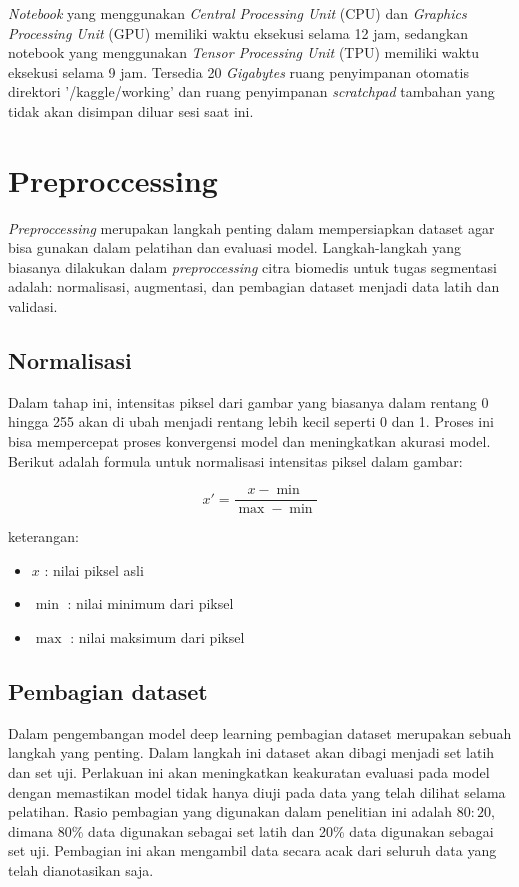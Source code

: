 \noindent \textit{Notebook} yang menggunakan \textit{Central Processing Unit }(CPU) dan \textit{Graphics Processing Unit} (GPU) memiliki waktu eksekusi selama 12 jam, sedangkan notebook yang menggunakan \textit{Tensor Processing Unit} (TPU) memiliki waktu eksekusi selama 9 jam. Tersedia 20 \textit{Gigabytes} ruang penyimpanan otomatis direktori '/kaggle/working' dan ruang penyimpanan \textit{scratchpad} tambahan yang tidak akan disimpan diluar sesi saat ini.


\section{Preproccessing}

\noindent \textit{Preproccessing} merupakan langkah penting dalam mempersiapkan dataset agar bisa gunakan dalam pelatihan dan evaluasi model. Langkah-langkah yang biasanya dilakukan dalam \textit{preproccessing} citra biomedis untuk tugas segmentasi adalah: normalisasi, augmentasi, dan pembagian dataset menjadi data latih dan validasi.

\subsection{Normalisasi}

\noindent Dalam tahap ini, intensitas piksel dari gambar yang biasanya dalam rentang 0 hingga 255 akan di ubah menjadi rentang lebih kecil seperti 0 dan 1. Proses ini bisa mempercepat proses konvergensi model dan meningkatkan akurasi model. Berikut adalah formula untuk normalisasi intensitas piksel dalam gambar:

\begin{equation}
	x' = \frac{x - \min}{\max - \min}
\end{equation}

\noindent
keterangan:
\begin{itemize}
	\item $x$ : nilai piksel asli
	\item $\min$ : nilai minimum dari piksel
	\item $\max$ : nilai maksimum dari piksel
\end{itemize}


\subsection{Pembagian dataset}

\noindent Dalam pengembangan model deep learning pembagian dataset merupakan sebuah langkah yang penting. Dalam langkah ini dataset akan dibagi menjadi set latih dan set uji. Perlakuan ini akan meningkatkan keakuratan evaluasi pada model dengan memastikan model tidak hanya diuji pada data yang telah dilihat selama pelatihan. Rasio pembagian yang digunakan dalam penelitian ini adalah \(80:20\), dimana 80\% data digunakan sebagai set latih dan 20\% data digunakan sebagai set uji. Pembagian ini akan mengambil data secara acak dari seluruh data yang telah dianotasikan saja. 

